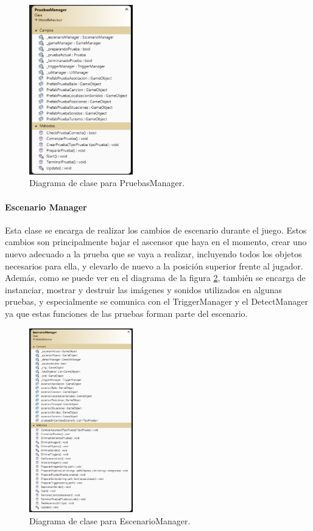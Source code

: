 \begin{figure}
	\centering
	\includegraphics[width=0.4\textwidth]{04.Desarrollo/05.Entrega5/01.Iteracion5_1/00.Figuras/14.diagrama_pruebas_manager.png}
	\caption{Diagrama de clase para PruebasManager.}
	\label{fig:diagramaPruebasManager}
\end{figure}



\paragraph{Escenario Manager}
Esta clase se encarga de realizar los cambios de escenario durante el juego. Estos cambios son principalmente bajar el ascensor que haya en el momento, crear uno nuevo adecuado a la prueba que se vaya a realizar, incluyendo todos los objetos necesarios para ella, y elevarlo de nuevo a la posición superior frente al jugador. Además, como se puede ver en el diagrama de la figura \ref{fig:diagramaEscenarioManager}, también se encarga de instanciar, mostrar y destruir las imágenes y sonidos utilizados en algunas pruebas, y especialmente se comunica con el TriggerManager y el DetectManager ya que estas funciones de las pruebas forman parte del escenario.

\begin{figure}
	\centering
	\includegraphics[width=0.4\textwidth]{04.Desarrollo/05.Entrega5/01.Iteracion5_1/00.Figuras/15.diagrama_escenario.png}
	\caption{Diagrama de clase para EscenarioManager.}
	\label{fig:diagramaEscenarioManager}
\end{figure}



